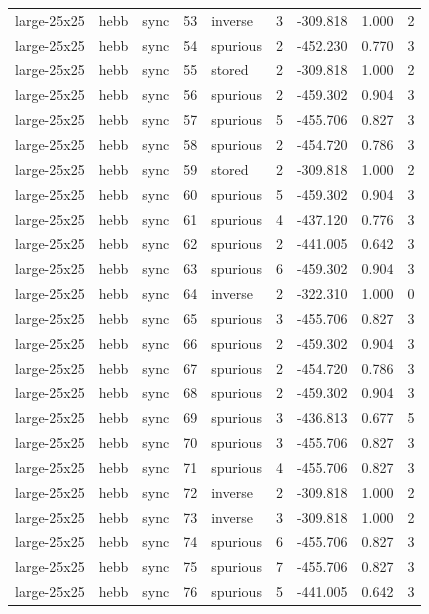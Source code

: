 \begin{tabular}{lllrlrrrr}
large-25x25 & hebb & sync & 53 & inverse & 3 & -309.818 & 1.000 & 2 \\
large-25x25 & hebb & sync & 54 & spurious & 2 & -452.230 & 0.770 & 3 \\
large-25x25 & hebb & sync & 55 & stored & 2 & -309.818 & 1.000 & 2 \\
large-25x25 & hebb & sync & 56 & spurious & 2 & -459.302 & 0.904 & 3 \\
large-25x25 & hebb & sync & 57 & spurious & 5 & -455.706 & 0.827 & 3 \\
large-25x25 & hebb & sync & 58 & spurious & 2 & -454.720 & 0.786 & 3 \\
large-25x25 & hebb & sync & 59 & stored & 2 & -309.818 & 1.000 & 2 \\
large-25x25 & hebb & sync & 60 & spurious & 5 & -459.302 & 0.904 & 3 \\
large-25x25 & hebb & sync & 61 & spurious & 4 & -437.120 & 0.776 & 3 \\
large-25x25 & hebb & sync & 62 & spurious & 2 & -441.005 & 0.642 & 3 \\
large-25x25 & hebb & sync & 63 & spurious & 6 & -459.302 & 0.904 & 3 \\
large-25x25 & hebb & sync & 64 & inverse & 2 & -322.310 & 1.000 & 0 \\
large-25x25 & hebb & sync & 65 & spurious & 3 & -455.706 & 0.827 & 3 \\
large-25x25 & hebb & sync & 66 & spurious & 2 & -459.302 & 0.904 & 3 \\
large-25x25 & hebb & sync & 67 & spurious & 2 & -454.720 & 0.786 & 3 \\
large-25x25 & hebb & sync & 68 & spurious & 2 & -459.302 & 0.904 & 3 \\
large-25x25 & hebb & sync & 69 & spurious & 3 & -436.813 & 0.677 & 5 \\
large-25x25 & hebb & sync & 70 & spurious & 3 & -455.706 & 0.827 & 3 \\
large-25x25 & hebb & sync & 71 & spurious & 4 & -455.706 & 0.827 & 3 \\
large-25x25 & hebb & sync & 72 & inverse & 2 & -309.818 & 1.000 & 2 \\
large-25x25 & hebb & sync & 73 & inverse & 3 & -309.818 & 1.000 & 2 \\
large-25x25 & hebb & sync & 74 & spurious & 6 & -455.706 & 0.827 & 3 \\
large-25x25 & hebb & sync & 75 & spurious & 7 & -455.706 & 0.827 & 3 \\
large-25x25 & hebb & sync & 76 & spurious & 5 & -441.005 & 0.642 & 3 \\

\end{tabular}
